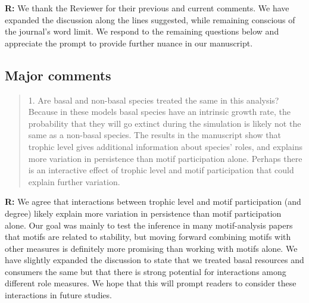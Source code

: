 \documentclass[12pt]{article}
\begin{document}
  \smallskip

  \textbf{R:} We thank the Reviewer for their previous and current comments. We have expanded the discussion along the lines suggested, while remaining conscious of the journal's word limit. We respond to the remaining questions below and appreciate the prompt to provide further nuance in our manuscript.

  \smallskip

  \subsection*{Major comments} 

    \begin{quotation}
      1. Are basal and non-basal species treated the same in this analysis? Because in these models basal species have an intrinsic growth rate, the probability that they will go extinct during the simulation is likely not the same as a non-basal species. The results in the manuscript show that trophic level gives additional information about species' roles, and explains more variation in persistence than motif participation alone. Perhaps there is an interactive effect of trophic level and motif participation that could explain further variation.
    \end{quotation}

    \smallskip

    \textbf{R:} We agree that interactions between trophic level and motif participation (and degree) likely explain more variation in persistence than motif participation alone. Our goal was mainly to test the inference in many motif-analysis papers that motifs are related to stability, but moving forward combining motifs with other measures is definitely more promising than working with motifs alone. We have slightly expanded the discussion to state that we treated basal resources and consumers the same but that there is strong potential for interactions among different role measures. We hope that this will prompt readers to consider these interactions in future studies.
\end{document}
